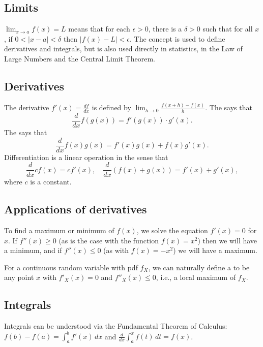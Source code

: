 \label{calculus}


\subsection{Limits}

$\lim_{x\to a}f(x)=L$ means that for each $\epsilon>0$, there is a $\delta>0$ such that for all $x$, if $0<|x-a|<\delta$ then $|f(x)-L|<\epsilon$.
The concept is used to define derivatives and integrals, but is also used directly in statistics, in the Law of Large Numbers and the Central Limit Theorem.

\subsection{Derivatives}

The derivative $f'(x)=\frac{df}{dx}$ is defined by $\lim_{h\to 0}\frac{f(x+h)-f(x)}h$. The  says that
\[
\frac{d}{dx}f(g(x))=f'(g(x))\cdot g'(x).
\]
The  says that
\[
\frac{d}{dx} f(x)g(x) = f'(x)g(x)+f(x)g'(x).
\]
Differentiation is a linear operation in the sense that
\[
\frac{d}{dx} cf(x)=cf'(x),\quad \frac{d}{dx}(f(x)+g(x)) = f'(x)+g'(x),
\]
where $c$ is a constant.

\subsection{Applications of derivatives}%

To find a maximum or minimum of $f(x)$, we solve the equation $f'(x)=0$ for $x$.
If $f''(x)\ge 0$ (as is the case with the function $f(x)=x^2$) then we will have a minimum,
and if $f''(x)\le 0$ (as with $f(x)=-x^2$) we will have a maximum.

For a continuous random variable with pdf $f_X$, we can naturally define a  to be any point $x$ with $f'_X(x)=0$ and $f''_X(x)\le 0$, i.e., a local maximum of $f_X$.

\subsection{Integrals}

Integrals can be understood via the Fundamental Theorem of Calculus: $f(b)-f(a)=\int_a^b f'(x)\,dx$ and $\frac{d}{dx}\int_a^x f(t)\,dt=f(x)$.

